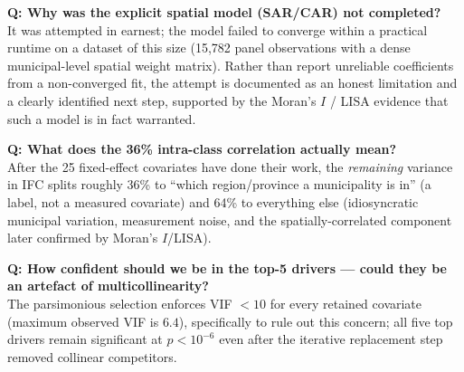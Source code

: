 \documentclass[11pt,a4paper]{article}
\begin{document}
\textbf{Q: Why was the explicit spatial model (SAR/CAR) not
completed?}\\
It was attempted in earnest; the model failed to converge within a
practical runtime on a dataset of this size (15{,}782 panel
observations with a dense municipal-level spatial weight matrix).
Rather than report unreliable coefficients from a non-converged fit,
the attempt is documented as an honest limitation and a clearly
identified next step, supported by the Moran's $I$ / LISA evidence
that such a model is in fact warranted.

\textbf{Q: What does the 36\% intra-class correlation actually
mean?}\\
After the 25 fixed-effect covariates have done their work, the
\emph{remaining} variance in IFC splits roughly 36\% to ``which
region/province a municipality is in'' (a label, not a measured
covariate) and 64\% to everything else (idiosyncratic municipal
variation, measurement noise, and the spatially-correlated component
later confirmed by Moran's $I$/LISA).

\textbf{Q: How confident should we be in the top-5 drivers — could
they be an artefact of multicollinearity?}\\
The parsimonious selection enforces VIF $<10$ for every retained
covariate (maximum observed VIF is $6.4$), specifically to rule out
this concern; all five top drivers remain significant at
$p<10^{-6}$ even after the iterative replacement step removed
collinear competitors.
\end{document}
